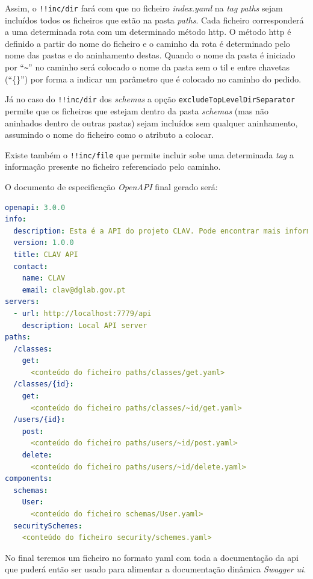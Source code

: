 Assim, o \texttt{!!inc/dir} fará com que no ficheiro \textit{index.yaml} na \textit{tag} \textit{paths} sejam 
incluídos todos os ficheiros que estão na pasta \textit{paths}. Cada ficheiro corresponderá a uma determinada 
rota com um determinado método \acrshort{http}. O método \acrshort{http} é definido a partir do nome do ficheiro 
e o caminho da rota é determinado pelo nome das pastas e do aninhamento destas. Quando o nome da pasta é iniciado 
por ``\verb|~|'' no caminho será colocado o nome da pasta sem o til e entre chavetas (``\{\}'') por forma a 
indicar um parâmetro que é colocado no caminho do pedido.

Já no caso do \texttt{!!inc/dir} dos \textit{schemas} a opção \texttt{excludeTopLevelDirSeparator} permite que 
os ficheiros que estejam dentro da pasta \textit{schemas} (mas não aninhados dentro de outras pastas) sejam 
incluídos sem qualquer aninhamento, assumindo o nome do ficheiro como o atributo a colocar.

Existe também o \texttt{!!inc/file} que permite incluir sobe uma determinada \textit{tag} a informação presente 
no ficheiro referenciado pelo caminho.

O documento de especificação \textit{OpenAPI} final gerado será:
\begin{lstlisting}[language=yaml, caption=Documento de especificação \textit{OpenAPI} gerado a partir do ficheiro \textit{index.yaml} com o uso da \textit{package} \texttt{yaml-include}, label=exem:yamlif]
openapi: 3.0.0
info:
  description: Esta é a API do projeto CLAV. Pode encontrar mais informação sobre o CLAV em [http://clav.dglab.gov.pt](http://clav.dglab.gov.pt).
  version: 1.0.0
  title: CLAV API
  contact:
    name: CLAV
    email: clav@dglab.gov.pt
servers:
  - url: http://localhost:7779/api
    description: Local API server
paths:
  /classes:
    get:
      <conteúdo do ficheiro paths/classes/get.yaml>
  /classes/{id}:
    get:
      <conteúdo do ficheiro paths/classes/~id/get.yaml>
  /users/{id}:
    post:
      <conteúdo do ficheiro paths/users/~id/post.yaml>
    delete:
      <conteúdo do ficheiro paths/users/~id/delete.yaml>
components:
  schemas:
    User:
      <conteúdo do ficheiro schemas/User.yaml>
  securitySchemes:
    <conteúdo do ficheiro security/schemes.yaml>
\end{lstlisting}

No final teremos um ficheiro no formato \acrshort{yaml} com toda a documentação da \acrshort{api} que puderá 
então ser usado para alimentar a documentação dinâmica \textit{Swagger \acrshort{ui}}.

